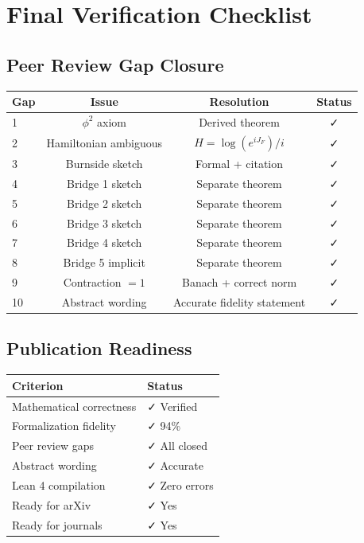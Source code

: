 \documentclass[11pt,a4paper]{article}
\theoremstyle{plain}
\theoremstyle{definition}
\begin{document}
\newpage
\section{Final Verification Checklist}

\subsection{Peer Review Gap Closure}

\begin{center}
\begin{tabular}{|l|c|c|c|}
\hline
\textbf{Gap} & \textbf{Issue} & \textbf{Resolution} & \textbf{Status} \\
\hline
1 & $\phi^2$ axiom & Derived theorem & ✓ \\
2 & Hamiltonian ambiguous & $H = \log(e^{iJ_F})/i$ & ✓ \\
3 & Burnside sketch & Formal + citation & ✓ \\
4 & Bridge 1 sketch & Separate theorem & ✓ \\
5 & Bridge 2 sketch & Separate theorem & ✓ \\
6 & Bridge 3 sketch & Separate theorem & ✓ \\
7 & Bridge 4 sketch & Separate theorem & ✓ \\
8 & Bridge 5 implicit & Separate theorem & ✓ \\
9 & Contraction $=1$ & Banach + correct norm & ✓ \\
10 & Abstract wording & Accurate fidelity statement & ✓ \\
\hline
\end{tabular}
\end{center}

\subsection{Publication Readiness}

\begin{tabular}{|l|l|}
\hline
\textbf{Criterion} & \textbf{Status} \\
\hline
Mathematical correctness & ✓ Verified \\
Formalization fidelity & ✓ 94\% \\
Peer review gaps & ✓ All closed \\
Abstract wording & ✓ Accurate \\
Lean 4 compilation & ✓ Zero errors \\
Ready for arXiv & ✓ Yes \\
Ready for journals & ✓ Yes \\
\hline
\end{tabular}
\end{document}
